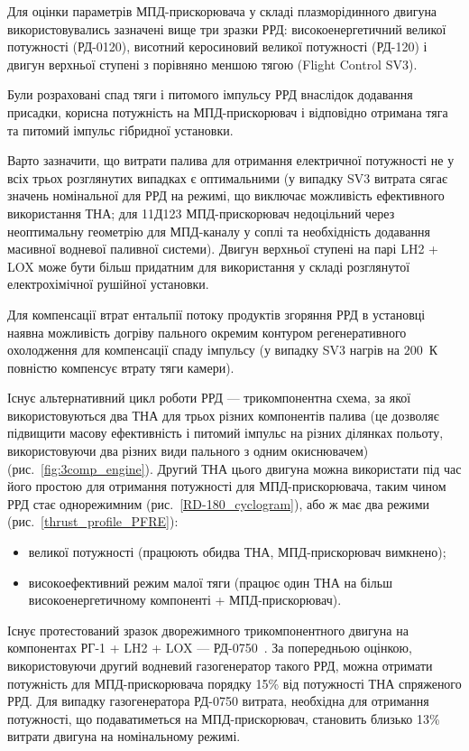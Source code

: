 
Для оцінки параметрів МПД-прискорювача у складі плазморідинного двигуна використовувались зазначені вище три зразки РРД: високоенергетичний великої потужності (РД-0120), висотний керосиновий великої потужності (РД-120) і двигун верхньої ступені з порівняно меншою тягою (Flight Control SV3).

Були розраховані спад тяги і питомого імпульсу РРД внаслідок додавання присадки, корисна потужність на МПД-прискорювач і відповідно отримана тяга та питомий імпульс гібридної установки.

Варто зазначити, що витрати палива для отримання електричної потужності не у всіх трьох розглянутих випадках є оптимальними (у випадку SV3 витрата сягає значень номінальної для РРД на режимі, що виключає можливість ефективного використання ТНА; для 11Д123 МПД-прискорювач недоцільний через неоптимальну геометрію для МПД-каналу у соплі та необхідність додавання масивної водневої паливної системи). Двигун верхньої ступені на парі LH2 + LOX може бути більш придатним для використання у складі розглянутої електрохімічної рушійної установки.

Для компенсації втрат ентальпії потоку продуктів згоряння РРД в установці наявна можливість догріву пального окремим контуром регенеративного охолодження для компенсації спаду імпульсу (у випадку SV3 нагрів на $200$~К повністю компенсує втрату тяги камери).

Існує альтернативний цикл роботи РРД --- трикомпонентна схема, за якої використовуються два ТНА для трьох різних компонентів палива (це дозволяє підвищити масову ефективність і питомий імпульс на різних ділянках польоту, використовуючи два різних види пального з одним окиснювачем) (рис.~\ref{fig:3comp_engine}). Другий ТНА цього двигуна можна використати під час його простою для отримання потужності для МПД-прискорювача, таким чином РРД стає однорежимним (рис.~\ref{RD-180_cyclogram}), або ж має два режими (рис.~\ref{thrust_profile_PFRE}):

\begin{itemize}
	\item великої потужності (працюють обидва ТНА, МПД-прискорювач вимкнено);
	\item високоефективний режим малої тяги (працює один ТНА на більш високоенергетичному компоненті + МПД-прискорювач).
\end{itemize}

Існує протестований зразок дворежимного трикомпонентного двигуна на компонентах РГ-1 + LH2 + LOX --- РД-0750~\cite{RD-0120}. За попередньою оцінкою, використовуючи другий водневий газогенератор такого РРД, можна отримати потужність для МПД-прискорювача порядку 15\% від потужності ТНА спряженого РРД. Для випадку газогенератора РД-0750 витрата, необхідна для отримання потужності, що подаватиметься на МПД-прискорювач, становить близько 13\% витрати двигуна на номінальному режимі.

